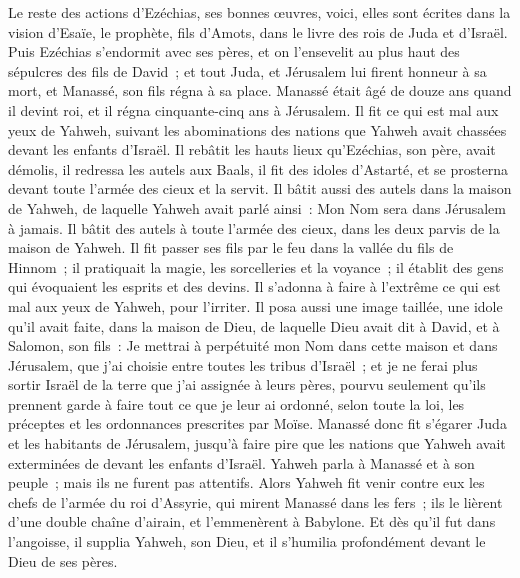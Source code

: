 \begin{multicols}{2}
Le reste des actions d'Ezéchias, ses bonnes œuvres, voici, elles sont écrites dans la vision d'Esaïe, le prophète, fils d'Amots, dans le livre des rois de Juda et d'Israël.
Puis Ezéchias s'endormit avec ses pères, et on l'ensevelit au plus haut des sépulcres des fils de David~; et tout Juda, et Jérusalem lui firent honneur à sa mort, et Manassé, son fils régna à sa place.
\VerseOne{}Manassé était âgé de douze ans quand il devint roi, et il régna cinquante-cinq ans à Jérusalem.
Il fit ce qui est mal aux yeux de Yahweh, suivant les abominations des nations que Yahweh avait chassées devant les enfants d'Israël.
Il rebâtit les hauts lieux qu'Ezéchias, son père, avait démolis, il redressa les autels aux Baals, il fit des idoles d'Astarté, et se prosterna devant toute l'armée des cieux et la servit.
Il bâtit aussi des autels dans la maison de Yahweh, de laquelle Yahweh avait parlé ainsi~: Mon Nom sera dans Jérusalem à jamais.
Il bâtit des autels à toute l'armée des cieux, dans les deux parvis de la maison de Yahweh.
Il fit passer ses fils par le feu dans la vallée du fils de Hinnom~; il pratiquait la magie, les sorcelleries et la voyance~; il établit des gens qui évoquaient les esprits et des devins. Il s'adonna à faire à l'extrême ce qui est mal aux yeux de Yahweh, pour l'irriter.
Il posa aussi une image taillée, une idole qu'il avait faite, dans la maison de Dieu, de laquelle Dieu avait dit à David, et à Salomon, son fils~: Je mettrai à perpétuité mon Nom dans cette maison et dans Jérusalem, que j'ai choisie entre toutes les tribus d'Israël~;
et je ne ferai plus sortir Israël de la terre que j'ai assignée à leurs pères, pourvu seulement qu'ils prennent garde à faire tout ce que je leur ai ordonné, selon toute la loi, les préceptes et les ordonnances prescrites par Moïse.
Manassé donc fit s'égarer Juda et les habitants de Jérusalem, jusqu'à faire pire que les nations que Yahweh avait exterminées de devant les enfants d'Israël.
Yahweh parla à Manassé et à son peuple~; mais ils ne furent pas attentifs.
Alors Yahweh fit venir contre eux les chefs de l'armée du roi d'Assyrie, qui mirent Manassé dans les fers~; ils le lièrent d'une double chaîne d'airain, et l'emmenèrent à Babylone.
Et dès qu'il fut dans l'angoisse, il supplia Yahweh, son Dieu, et il s'humilia profondément devant le Dieu de ses pères.

\end{multicols}
